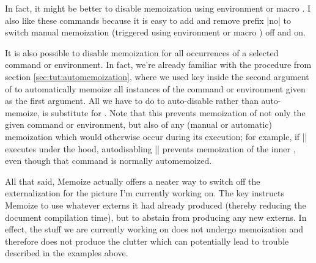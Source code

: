 \documentclass[a4paper,11pt]{article}
\begin{document}
In fact, it might be better to disable memoization using environment
 or macro .  I also like these
commands because it is easy to add and remove prefix |no| to switch manual
memoization (triggered using environment  or macro
) off and on.

\begin{tcbraster}[raster columns=2, raster equal height=rows]
\end{tcbraster}

It is also possible to disable memoization for all occurrences of a selected
command or environment.  In fact, we're already familiar with the procedure
from section \ref{sec:tut:automemoization}, where we used key
 inside the second argument of  to
automatically memoize all instances of the command or environment given as the
first argument.  All we have to do to auto-disable rather than auto-memoize, is
substitute  for .  Note that this
prevents memoization of not only the given command or environment, but also of
any (manual or automatic) memoization which would otherwise occur during its
execution; for example, if |\foo| executes  under the hood,
autodisabling |\foo| prevents memoization of the inner , even though
that command is normally automemoized.

\begin{tcbraster}[raster columns=2, raster equal height=rows]
\end{tcbraster}

All that said, Memoize actually offers a neater way to switch off the
externalization for the picture I'm currently working on.  The
 key instructs Memoize to use whatever externs it had
already produced (thereby reducing the document compilation time), but to
abstain from producing any new externs.  In effect, the stuff we are currently
working on does not undergo memoization and therefore does not produce the
clutter which can potentially lead to trouble described in the 
examples above.
\end{document}
